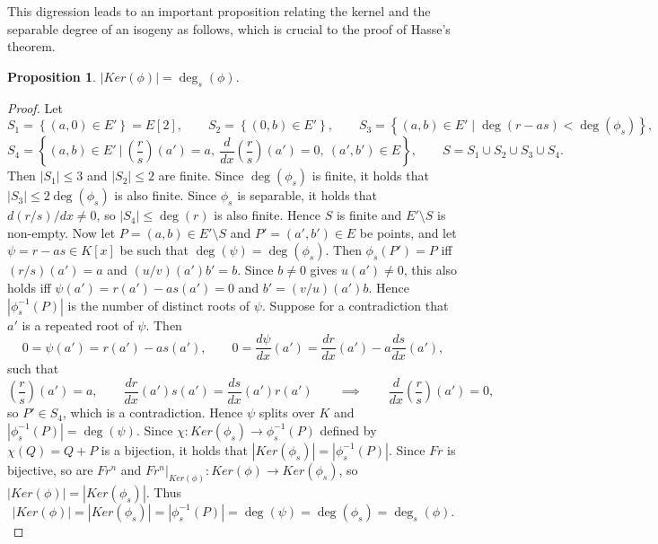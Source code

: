 \documentclass{article}
\newcommand{\val}[1]{\left. #1 \right\rvert}
\newcommand{\rb}[1]{\left( #1 \right)}
\renewcommand{\sb}[1]{\left[ #1 \right]}
\newcommand{\cb}[1]{\left\{ #1 \right\}}
\newcommand{\abs}[1]{\left\lvert #1 \right\rvert}
\theoremstyle{definition}\newtheorem*{definition}{Definition}
\theoremstyle{definition}\newtheorem*{example}{Example}
\theoremstyle{definition}\newtheorem*{remark}{Remark}
\newtheorem{proposition}{Proposition}[subsection]
\begin{document}
This digression leads to an important proposition relating the kernel and the separable degree of an isogeny as follows, which is crucial to the proof of Hasse's theorem.

\begin{proposition}
$ \abs{Ker\rb{\phi}} = \deg_s\rb{\phi} $.
\end{proposition}

\begin{proof}
Let
$$ S_1 = \cb{\rb{a, 0} \in E'} = E\sb{2}, \qquad S_2 = \cb{\rb{0, b} \in E'}, \qquad S_3 = \cb{\rb{a, b} \in E' \mid \deg\rb{r - as} < \deg\rb{\phi_s}}, $$
$$ S_4 = \cb{\rb{a, b} \in E' \ \Bigg| \ \rb{\dfrac{r}{s}}\rb{a'} = a, \ \dfrac{d}{dx}\rb{\dfrac{r}{s}}\rb{a'} = 0, \ \rb{a', b'} \in E}, \qquad S = S_1 \cup S_2 \cup S_3 \cup S_4. $$
Then $ \abs{S_1} \le 3 $ and $ \abs{S_2} \le 2 $ are finite. Since $ \deg\rb{\phi_s} $ is finite, it holds that $ \abs{S_3} \le 2\deg\rb{\phi_s} $ is also finite. Since $ \phi_s $ is separable, it holds that $ d\rb{r / s} / dx \ne 0 $, so $ \abs{S_4} \le \deg\rb{r} $ is also finite. Hence $ S $ is finite and $ E' \setminus S $ is non-empty. Now let $ P = \rb{a, b} \in E' \setminus S $ and $ P' = \rb{a', b'} \in E $ be points, and let $ \psi = r - as \in K\sb{x} $ be such that $ \deg\rb{\psi} = \deg\rb{\phi_s} $. Then $ \phi_s\rb{P'} = P $ iff $ \rb{r / s}\rb{a'} = a $ and $ \rb{u / v}\rb{a'}b' = b $. Since $ b \ne 0 $ gives $ u\rb{a'} \ne 0 $, this also holds iff $ \psi\rb{a'} = r\rb{a'} - as\rb{a'} = 0 $ and $ b' = \rb{v / u}\rb{a'}b $. Hence $ \abs{\phi_s^{-1}\rb{P}} $ is the number of distinct roots of $ \psi $. Suppose for a contradiction that $ a' $ is a repeated root of $ \psi $. Then
$$ 0 = \psi\rb{a'} = r\rb{a'} - as\rb{a'}, \qquad 0 = \dfrac{d\psi}{dx}\rb{a'} = \dfrac{dr}{dx}\rb{a'} - a\dfrac{ds}{dx}\rb{a'}, $$
such that
$$ \rb{\dfrac{r}{s}}\rb{a'} = a, \qquad \dfrac{dr}{dx}\rb{a'}s\rb{a'} = \dfrac{ds}{dx}\rb{a'}r\rb{a'} \qquad \implies \qquad \dfrac{d}{dx}\rb{\dfrac{r}{s}}\rb{a'} = 0, $$
so $ P' \in S_4 $, which is a contradiction. Hence $ \psi $ splits over $ K $ and $ \abs{\phi_s^{-1}\rb{P}} = \deg\rb{\psi} $. Since $ \chi : Ker\rb{\phi_s} \to \phi_s^{-1}\rb{P} $ defined by $ \chi\rb{Q} = Q + P $ is a bijection, it holds that $ \abs{Ker\rb{\phi_s}} = \abs{\phi_s^{-1}\rb{P}} $. Since $ Fr $ is bijective, so are $ Fr^n $ and $ \val{Fr^n}_{Ker\rb{\phi}} : Ker\rb{\phi} \to Ker\rb{\phi_s} $, so $ \abs{Ker\rb{\phi}} = \abs{Ker\rb{\phi_s}} $. Thus
$$ \abs{Ker\rb{\phi}} = \abs{Ker\rb{\phi_s}} = \abs{\phi_s^{-1}\rb{P}} = \deg\rb{\psi} = \deg\rb{\phi_s} = \deg_s\rb{\phi}. $$
\end{proof}
\end{document}
